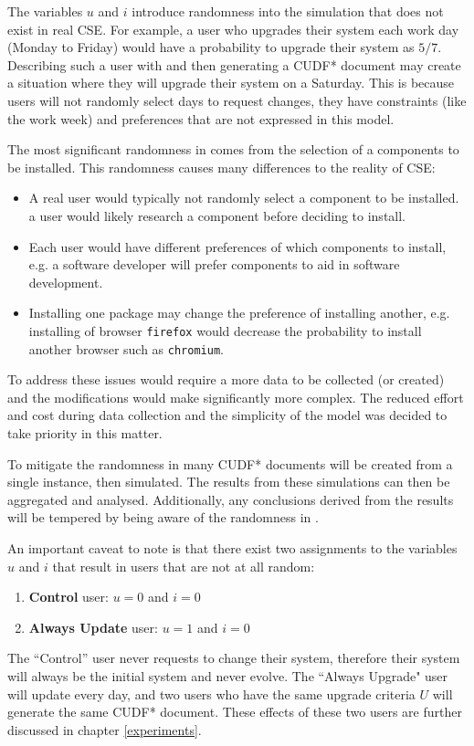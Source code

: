 The variables $u$ and $i$ introduce randomness into the simulation that does not exist in real CSE.
For example, a user who upgrades their system each work day (Monday to Friday) would have a probability to upgrade their system as $5/7$.
Describing such a user with \usermodel and then generating a CUDF* document may create a situation where they will upgrade their system on a Saturday.
This is because users will not randomly select days to request changes, they have constraints (like the work week) and preferences that are not expressed in this model.

The most significant randomness in \usermodel comes from the selection of a components to be installed.
This randomness causes many differences to the reality of CSE:
\begin{itemize}
  \item A real user would typically not randomly select a component to be installed. a user would likely research a component before deciding to install.
  \item Each user would have different preferences of which components to install, e.g. a software developer will prefer components to aid in software development.
  \item Installing one package may change the preference of installing another, e.g. installing of browser \texttt{firefox} would decrease the probability to install another browser such as \texttt{chromium}.
\end{itemize}
To address these issues would require a more data to be collected (or created) and the modifications would make \usermodel significantly more complex.
The reduced effort and cost during data collection and the simplicity of the model was decided to take priority in this matter.

To mitigate the randomness in \usermodel many CUDF* documents will be created from a single \usermodel instance, then simulated.
The results from these simulations can then be aggregated and analysed.
Additionally, any conclusions derived from the results will be tempered by being aware of the randomness in \usermodel.

An important caveat to note is that there exist two assignments to the variables $u$ and $i$ that result in users that are not at all random:
\begin{enumerate}
  \item \textbf{Control} user: $u = 0$ and $i = 0$
  \item \textbf{Always Update} user: $u = 1$ and $i = 0$
\end{enumerate}
The ``Control'' user never requests to change their system, therefore their system will always be the initial system and never evolve.
The ``Always Upgrade" user will update every day, and two users who have the same upgrade criteria $U$ will generate the same CUDF* document.
These effects of these two users are further discussed in chapter \ref{experiments}.

